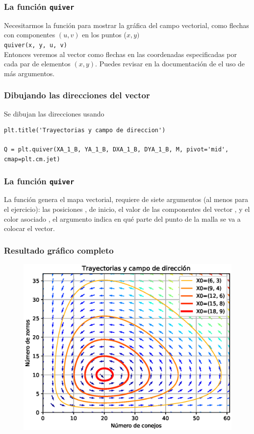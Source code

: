 \begin{frame}[fragile]
\frametitle{La función \texttt{quiver}}
Necesitarmos la función  para mostrar la gráfica del campo vectorial, como flechas con componentes $(u, v)$ en los puntos ($x, y)$
\\
\medskip
\verb|quiver(x, y, u, v)|
\\
\medskip
Entonces veremos al vector como flechas en las coordenadas especificadas por cada par de elementos $(x, y)$. Puedes revisar en la documentación de  el uso de más argumentos.
\end{frame}
\begin{frame}
\frametitle{Dibujando las direcciones del vector}
Se dibujan las direcciones usando 
\begin{lstlisting}[caption=Dibujando las direcciones del vector resultante, style=codigopython]
plt.title('Trayectorias y campo de direccion')

Q = plt.quiver(XA_1_B, YA_1_B, DXA_1_B, DYA_1_B, M, pivot='mid', cmap=plt.cm.jet)
\end{lstlisting}
\end{frame}
\begin{frame}[fragile]
\frametitle{La función \texttt{quiver}} 
La función  genera el mapa vectorial, requiere de siete argumentos (al menos para el ejercicio): las posiciones ,  de inicio, el valor de las componentes del vector ,  y el color asociado , el argumento  indica en qué parte del punto de la malla se va a colocar el vector.
\end{frame}
\begin{frame}[plain]
\frametitle{Resultado gráfico completo}
\begin{figure}[h!]
    \centering
    \includegraphics[scale=0.5]{Imagenes/ejercicio_odeint_05_sistema_lotka-volterra_03.eps} 
\end{figure}
\end{frame}
